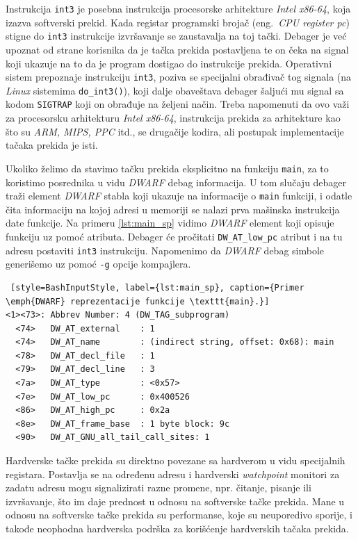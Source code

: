 \documentclass[12pt,oneside]{memoir}
\begin{document}
Instrukcija \texttt{int3} je posebna instrukcija procesorske arhitekture \emph{Intel x86-64}, koja izazva softverski prekid. Kada registar programski brojač (eng.~\emph{CPU register pc}) stigne do \texttt{int3} instrukcije izvršavanje se zaustavalja na toj tački. Debager je već upoznat od strane korisnika da je tačka prekida postavljena te on čeka na signal koji ukazuje na to da je program dostigao do instrukcije prekida. Operativni sistem prepoznaje instrukciju \texttt{int3}, poziva se specijalni obrađivač tog signala (na \emph{Linux} sistemima \texttt{do\_int3()}), koji dalje obaveštava debager šaljući mu signal sa kodom \texttt{SIGTRAP} koji on obrađuje na željeni način. Treba napomenuti da ovo važi za procesorsku arhitekturu \emph{Intel x86-64}, instrukcija prekida za arhitekture kao što su \emph{ARM, MIPS, PPC} itd., se drugačije kodira, ali postupak implementacije tačaka prekida je isti.

Ukoliko želimo da stavimo tačku prekida eksplicitno na funkciju \texttt{main}, za to koristimo posrednika u vidu \emph{DWARF} debag informacija. U tom slučaju debager traži element \emph{DWARF} stabla koji ukazuje na informacije o \texttt{main} funkciji, i odatle čita informaciju na kojoj adresi u memoriji se nalazi prva mašinska instrukcija date funkcije. Na primeru \ref{lst:main_sp} vidimo \emph{DWARF} element koji opisuje funkciju uz pomoć atributa. Debager će pročitati \texttt{DW\_AT\_low\_pc} atribut i na tu adresu postaviti \texttt{int3} instrukciju. Napomenimo da \emph{DWARF} debag simbole generišemo uz pomoć \texttt{-g} opcije kompajlera.
\begin{lstlisting} [style=BashInputStyle, label={lst:main_sp}, caption={Primer \emph{DWARF} reprezentacije funkcije \texttt{main}.}]
<1><73>: Abbrev Number: 4 (DW_TAG_subprogram)
  <74>   DW_AT_external    : 1
  <74>   DW_AT_name        : (indirect string, offset: 0x68): main
  <78>   DW_AT_decl_file   : 1
  <79>   DW_AT_decl_line   : 3
  <7a>   DW_AT_type        : <0x57>
  <7e>   DW_AT_low_pc      : 0x400526
  <86>   DW_AT_high_pc     : 0x2a
  <8e>   DW_AT_frame_base  : 1 byte block: 9c
  <90>   DW_AT_GNU_all_tail_call_sites: 1
\end{lstlisting}

Hardverske tačke prekida su direktno povezane sa hardverom u vidu specijalnih registara. Postavlja se na određenu adresu i hardverski \emph{watchpoint} monitori za zadatu adresu mogu signalizirati razne promene, npr. čitanje, pisanje ili izvršavanje, što im daje prednost u odnosu na softverske tačke prekida. Mane u odnosu na softverske tačke prekida su performanse, koje su neuporedivo sporije, i takođe neophodna hardverska podrška za korišćenje hardverskih tačaka prekida.
\end{document}
